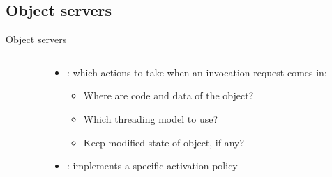 \subsection{Object servers}
\begin{slide}{Object servers}
  \begin{columns}[T]
    \begin{column}{0.35\textwidth}
    \end{column}
    \begin{column}{0.6\textwidth}
      \begin{itemize}
      \item {}: which actions to take when an invocation request comes in:
        \begin{itemize}\firmlist
        \item Where are code and data of the object?
        \item Which threading model to use?
        \item Keep modified state of object, if any?
        \end{itemize}
      \item {}: implements a specific activation policy
      \end{itemize}
    \end{column}
  \end{columns}
\end{slide}
